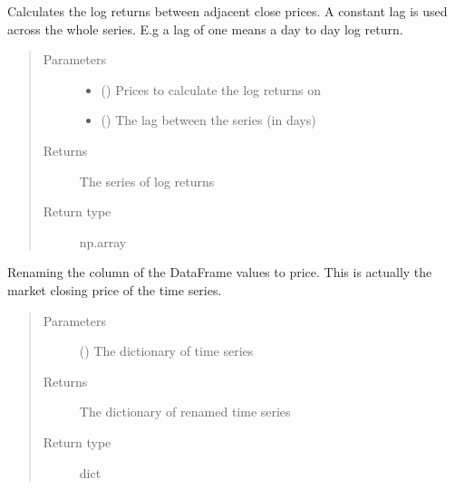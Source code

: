 \documentclass[letterpaper,10pt,english]{sphinxmanual}
\begin{document}
\begin{fulllineitems}
\label{\detokenize{preprocessing:Foresight.preprocessing.log_returns}}
Calculates the log returns between adjacent close prices.
A constant lag is used across the whole series.
E.g a lag of one means a day to day log return.
\begin{quote}\begin{description}
\item[{Parameters}] \leavevmode\begin{itemize}
\item {} 
 () \textendash{} Prices to calculate the log returns on

\item {} 
 () \textendash{} The lag between the series (in days)

\end{itemize}

\item[{Returns}] \leavevmode
The series of log returns

\item[{Return type}] \leavevmode
np.array

\end{description}\end{quote}

\end{fulllineitems}


\begin{fulllineitems}
\label{\detokenize{preprocessing:Foresight.preprocessing.price_rename}}
Renaming the column of the DataFrame values to price.
This is actually the market closing price of the time series.
\begin{quote}\begin{description}
\item[{Parameters}] \leavevmode
{} () \textendash{} The dictionary of time series

\item[{Returns}] \leavevmode
The dictionary of renamed time series

\item[{Return type}] \leavevmode
dict

\end{description}\end{quote}

\end{fulllineitems}
\end{document}
